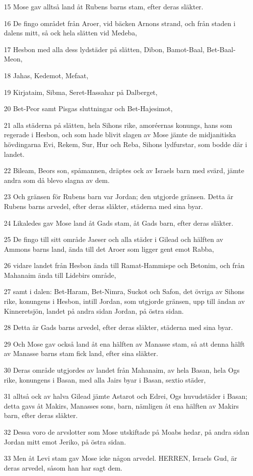 \par 15 Mose gav alltså land åt Rubens barns stam, efter deras släkter.
\par 16 De fingo området från Aroer, vid bäcken Arnons strand, och från staden i dalens mitt, så ock hela slätten vid Medeba,
\par 17 Hesbon med alla dess lydstäder på slätten, Dibon, Bamot-Baal, Bet-Baal-Meon,
\par 18 Jahas, Kedemot, Mefaat,
\par 19 Kirjataim, Sibma, Seret-Hassahar på Dalberget,
\par 20 Bet-Peor samt Pisgas sluttningar och Bet-Hajesimot,
\par 21 alla städerna på slätten, hela Sihons rike, amoréernas konungs, hans som regerade i Hesbon, och som hade blivit slagen av Mose jämte de midjanitiska hövdingarna Evi, Rekem, Sur, Hur och Reba, Sihons lydfurstar, som bodde där i landet.
\par 22 Bileam, Beors son, spåmannen, dräptes ock av Israels barn med svärd, jämte andra som då blevo slagna av dem.
\par 23 Och gränsen för Rubens barn var Jordan; den utgjorde gränsen. Detta är Rubens barns arvedel, efter deras släkter, städerna med sina byar.
\par 24 Likaledes gav Mose land åt Gads stam, åt Gads barn, efter deras släkter.
\par 25 De fingo till sitt område Jaeser och alla städer i Gilead och hälften av Ammons barns land, ända till det Aroer som ligger gent emot Rabba,
\par 26 vidare landet från Hesbon ända till Ramat-Hammispe och Betonim, och från Mahanaim ända till Lidebirs område,
\par 27 samt i dalen: Bet-Haram, Bet-Nimra, Suckot och Safon, det övriga av Sihons rike, konungens i Hesbon, intill Jordan, som utgjorde gränsen, upp till ändan av Kinneretsjön, landet på andra sidan Jordan, på östra sidan.
\par 28 Detta är Gads barns arvedel, efter deras släkter, städerna med sina byar.
\par 29 Och Mose gav också land åt ena hälften av Manasse stam, så att denna hälft av Manasse barns stam fick land, efter sina släkter.
\par 30 Deras område utgjordes av landet från Mahanaim, av hela Basan, hela Ogs rike, konungens i Basan, med alla Jairs byar i Basan, sextio städer,
\par 31 alltså ock av halva Gilead jämte Astarot och Edrei, Ogs huvudstäder i Basan; detta gavs åt Makirs, Manasses sons, barn, nämligen åt ena hälften av Makirs barn, efter deras släkter.
\par 32 Dessa voro de arvslotter som Mose utskiftade på Moabs hedar, på andra sidan Jordan mitt emot Jeriko, på östra sidan.
\par 33 Men åt Levi stam gav Mose icke någon arvedel. HERREN, Israels Gud, är deras arvedel, såsom han har sagt dem.


